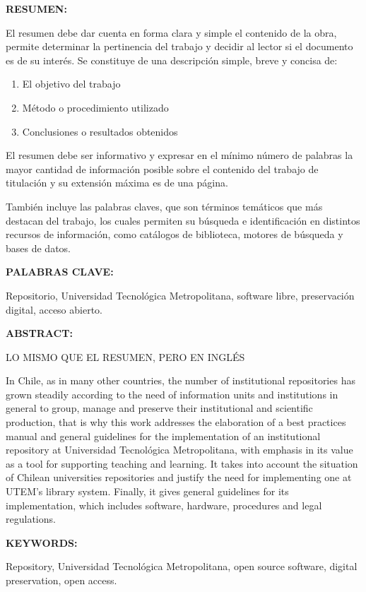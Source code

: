 \textbf{RESUMEN:}

El resumen debe dar cuenta en forma clara y simple el contenido de la obra, permite determinar la pertinencia del trabajo y decidir al lector si el documento es de su interés. Se constituye de una descripción simple, breve y concisa de:

\begin{enumerate}
    \item El objetivo del trabajo
    \item Método o procedimiento utilizado
    \item Conclusiones o resultados obtenidos
\end{enumerate}

El resumen debe ser informativo y expresar en el mínimo número de palabras la mayor cantidad de información posible sobre el contenido del trabajo de titulación y su extensión máxima es de una página.

También incluye las palabras claves, que son términos temáticos que más destacan del trabajo, los cuales permiten su búsqueda e identificación en distintos recursos de información, como catálogos de biblioteca, motores de búsqueda y bases de datos.

\textbf{PALABRAS CLAVE:}

Repositorio, Universidad Tecnológica Metropolitana, software libre, preservación digital, acceso abierto.

\newpage

\textbf{ABSTRACT:}

LO MISMO QUE EL RESUMEN, PERO EN INGLÉS

In Chile, as in many other countries, the number of institutional repositories has grown steadily according to the need of information units and institutions in general to group, manage and preserve their institutional and scientific production, that is why this work addresses the elaboration of a best practices manual and general guidelines for the implementation of an institutional repository at Universidad Tecnológica Metropolitana, with emphasis in its value as a tool for supporting teaching and learning. It takes into account the situation of Chilean universities repositories and justify the need for implementing one at UTEM’s library system. Finally, it gives general guidelines for its implementation, which includes software, hardware, procedures and legal regulations.

\textbf{KEYWORDS:}

Repository, Universidad Tecnológica Metropolitana, open source software, digital preservation, open access.